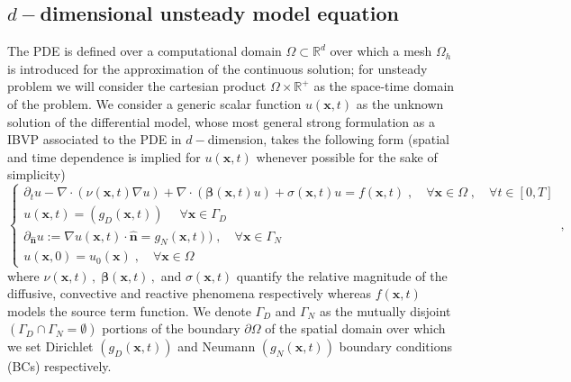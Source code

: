 \documentclass[12pt,openany,twoside,a4paper]{article}
\begin{document}
\subsection{$d-$dimensional unsteady model equation}
The PDE is defined over a computational domain $\Omega\subset\mathbb{R}^d$ over which a mesh $\Omega_h$ is introduced for the approximation of the continuous solution; for unsteady problem we will consider the cartesian product $\Omega\times\mathbb{R}^{+}$ as the space-time domain of the problem.
We consider a generic scalar function $u(\mathbf{x},t)$ as the unknown solution of the differential model, whose most general strong formulation as a IBVP associated to the PDE in $d-$dimension, takes the following form (spatial and time dependence is implied for $u(\mathbf{x},t)$ whenever possible for the sake of simplicity)
\begin{equation*}
    \begin{cases}
        \partial_t u- \nabla\cdot(\nu(\mathbf{x},t)\nabla u) + \nabla\cdot(\boldsymbol{\beta}(\mathbf{x},t)u) + \sigma(\mathbf{x},t)u = f(\mathbf{x},t)\;,\quad \forall\mathbf{x}\in\Omega\;,\quad\forall t\in[0,T] \\
        u(\mathbf{x},t) = (g_D(\mathbf{x},t))\;\quad\forall\mathbf{x}\in\Gamma_D \\
        \partial_{\mathbf{\hat{n}}}u := \nabla u(\mathbf{x},t)\cdot\mathbf{\hat{n}} = g_N(\mathbf{x},t))\;,\quad\forall\mathbf{x}\in\Gamma_N\\
        u(\mathbf{x},0) = u_0(\mathbf{x})\;,\quad\forall\mathbf{x}\in\Omega
    \end{cases}\,,
\end{equation*}
where $\nu(\mathbf{x},t)\,,\;\boldsymbol{\beta}(\mathbf{x},t)\,,$ and $\sigma(\mathbf{x},t)$ quantify the relative magnitude of the diffusive, convective and reactive phenomena respectively whereas $f(\mathbf{x},t)$ models the source term function. We denote $\Gamma_D$ and $\Gamma_N$ as the mutually disjoint $(\Gamma_D\cap\Gamma_N = \emptyset)$ portions of the boundary $\partial\Omega$ of the spatial domain over which we set Dirichlet $(g_D(\mathbf{x},t))$ and Neumann $(g_N(\mathbf{x},t))$ boundary conditions (BCs) respectively.
\end{document}
